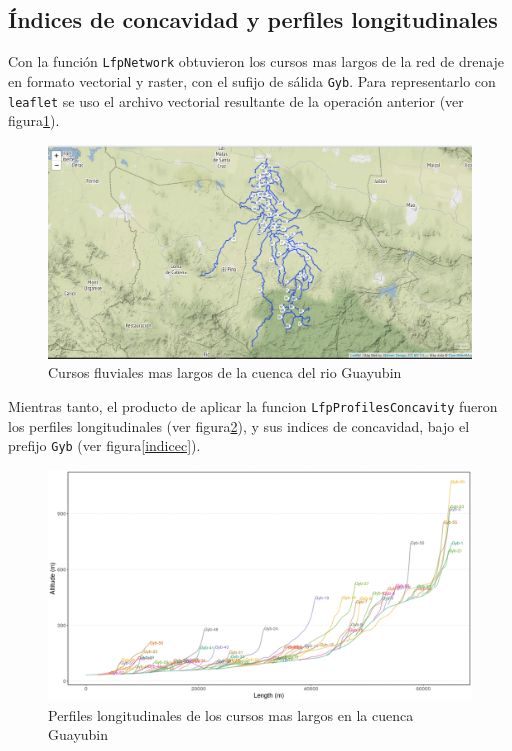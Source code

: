 \documentclass[11pt,]{article}
\begin{document}
\subsection{Índices de concavidad y perfiles
longitudinales}\label{uxedndices-de-concavidad-y-perfiles-longitudinales}

Con la función \texttt{LfpNetwork} obtuvieron los cursos mas largos de
la red de drenaje en formato vectorial y raster, con el sufijo de sálida
\texttt{Gyb}. Para representarlo con \texttt{leaflet} se uso el archivo
vectorial resultante de la operación anterior (ver figura\ref{lfpnet}).

\begin{figure}
\centering
\includegraphics[width=1.00000\textwidth]{cursos mas largos.png}
\caption{Cursos fluviales mas largos de la cuenca del rio
Guayubin\label{lfpnet}}
\end{figure}

Mientras tanto, el producto de aplicar la funcion
\texttt{LfpProfilesConcavity} fueron los perfiles longitudinales (ver
figura\ref{plongitudinal}), y sus indices de concavidad, bajo el prefijo
\texttt{Gyb} (ver figura\ref{indicec}).

\begin{figure}
\centering
\includegraphics[width=1.00000\textwidth]{perfiles longitudinales.png}
\caption{Perfiles longitudinales de los cursos mas largos en la cuenca
Guayubin\label{plongitudinal}}
\end{figure}
\end{document}
